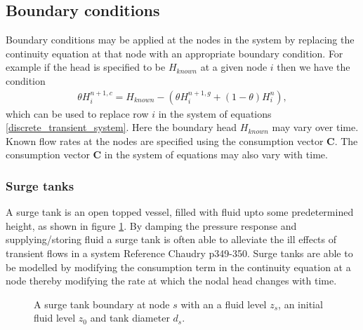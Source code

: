 \documentclass[12pt]{article}
\begin{document}
\subsection{Boundary conditions}

Boundary conditions may be applied at the nodes in the system by replacing the continuity equation at that node with an appropriate boundary condition. For example if the head is specified to be $H_{known}$ at a given node $i$ then we have the condition 
\begin{align}
\theta H_i^{n+1,c} = H_{known} - \left( \theta H_i^{n+1,g} + (1-\theta)H_i^n \right),
\end{align} 
which can be used to replace row $i$ in the system of equations \eqref{discrete_transient_system}. Here the boundary head $H_{known}$ may vary over time. Known flow rates at the nodes are specified using the consumption vector $\mathbf{C}$. The consumption vector $\mathbf{C}$ in the system of equations may also vary with time. 

\subsubsection{Surge tanks}

A surge tank is an open topped vessel, filled with fluid upto some predetermined height, as shown in figure \ref{fig:surge_tank_diagram}. By damping the pressure response and supplying/storing fluid a surge tank is often able to alleviate the ill effects of transient flows in a system {\color{red} Reference Chaudry p349-350}. Surge tanks are able to be modelled by modifying the consumption term in the continuity equation at a node thereby modifying the rate at which the nodal head changes with time. 

\begin{figure}
\centering
{} 
\caption{A surge tank boundary at node $s$ with an a fluid level $z_s$, an initial fluid level $z_0$ and tank diameter $d_s$.}
\label{fig:surge_tank_diagram}
\end{figure}
\end{document}
